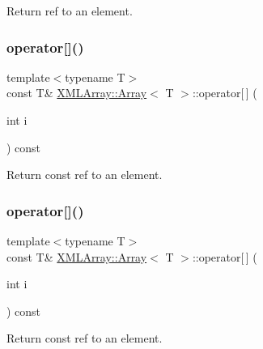 Return ref to an element. 

\mbox{\label{classXMLArray_1_1Array_a8e51d308c4e6b81cdbf1be40377afda8}} 
\subsubsection{\texorpdfstring{operator[]()}{operator[]()}\hspace{0.1cm}{\footnotesize\ttfamily [4/6]}}
{\footnotesize\ttfamily template$<$typename T$>$ \\
const T\& \mbox{\hyperlink{classXMLArray_1_1Array}{X\+M\+L\+Array\+::\+Array}}$<$ T $>$\+::operator\mbox{[}$\,$\mbox{]} (\begin{DoxyParamCaption}\item[{int}]{i }\end{DoxyParamCaption}) const\hspace{0.3cm}{\ttfamily [inline]}}



Return const ref to an element. 

\mbox{\label{classXMLArray_1_1Array_a8e51d308c4e6b81cdbf1be40377afda8}} 
\subsubsection{\texorpdfstring{operator[]()}{operator[]()}\hspace{0.1cm}{\footnotesize\ttfamily [5/6]}}
{\footnotesize\ttfamily template$<$typename T$>$ \\
const T\& \mbox{\hyperlink{classXMLArray_1_1Array}{X\+M\+L\+Array\+::\+Array}}$<$ T $>$\+::operator\mbox{[}$\,$\mbox{]} (\begin{DoxyParamCaption}\item[{int}]{i }\end{DoxyParamCaption}) const\hspace{0.3cm}{\ttfamily [inline]}}



Return const ref to an element. 

